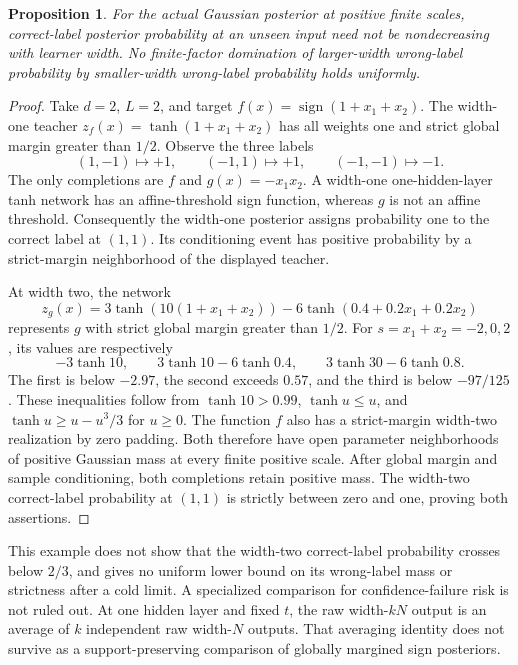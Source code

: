 \documentclass[11pt]{article}
\newtheorem{proposition}[theorem]{Proposition}
\theoremstyle{remark}\newtheorem{remark}[theorem]{Remark}
\begin{document}
\begin{proposition}\label{prop:nonmonotone}
For the actual Gaussian posterior at positive finite scales, correct-label
posterior probability at an unseen input need not be nondecreasing with
learner width. No finite-factor domination of larger-width wrong-label
probability by smaller-width wrong-label probability holds uniformly.
\end{proposition}
\begin{proof}
Take $d=2$, $L=2$, and target
$f(x)=\operatorname{sign}(1+x_1+x_2)$. The width-one teacher
$z_f(x)=\tanh(1+x_1+x_2)$ has all weights one and strict global
margin greater than $1/2$. Observe the three labels
\[
 (1,-1)\mapsto+1,\qquad(-1,1)\mapsto+1,\qquad(-1,-1)\mapsto-1.
\]
The only completions are $f$ and $g(x)=-x_1x_2$. A width-one
one-hidden-layer tanh network has an affine-threshold sign function,
whereas $g$ is not an affine threshold. Consequently the width-one
posterior assigns probability one to the correct label at $(1,1)$.
Its conditioning event has positive probability by a strict-margin
neighborhood of the displayed teacher.

At width two, the network
\[
 z_g(x)=3\tanh(10(1+x_1+x_2))
       -6\tanh(0.4+0.2x_1+0.2x_2)
\]
represents $g$ with strict global margin greater than $1/2$.
For $s=x_1+x_2=-2,0,2$, its values are respectively
\[
 -3\tanh10,\qquad3\tanh10-6\tanh0.4,\qquad
 3\tanh30-6\tanh0.8.
\]
The first is below $-2.97$, the second exceeds $0.57$, and the
third is below $-97/125$. These inequalities follow from
$\tanh10>0.99$, $\tanh u\le u$, and
$\tanh u\ge u-u^3/3$ for $u\ge0$.
The function $f$ also has a strict-margin width-two realization by
zero padding. Both therefore have open parameter neighborhoods of
positive Gaussian mass at every finite positive scale. After global
margin and sample conditioning, both completions retain positive mass.
The width-two correct-label probability at $(1,1)$ is strictly between
zero and one, proving both assertions.
\end{proof}

This example does not show that the width-two correct-label probability
crosses below $2/3$, and gives no uniform lower bound on its wrong-label
mass or strictness after a cold limit. A specialized comparison for
confidence-failure risk is not ruled out. At one hidden layer and fixed
$t$, the raw width-$kN$ output is an average of $k$ independent raw
width-$N$ outputs. That averaging identity does not survive as a
support-preserving comparison of globally margined sign posteriors.
\end{document}
